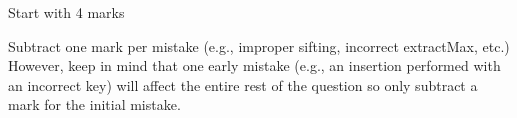 \begin{markingScheme}
Start with 4 marks

Subtract one mark per mistake (e.g., improper sifting, incorrect extractMax, etc.)
   However, keep in mind that one early mistake (e.g., an insertion performed
   with an incorrect key) will affect the entire rest of the question so only subtract
   a mark for the initial mistake.
\end{markingScheme}
